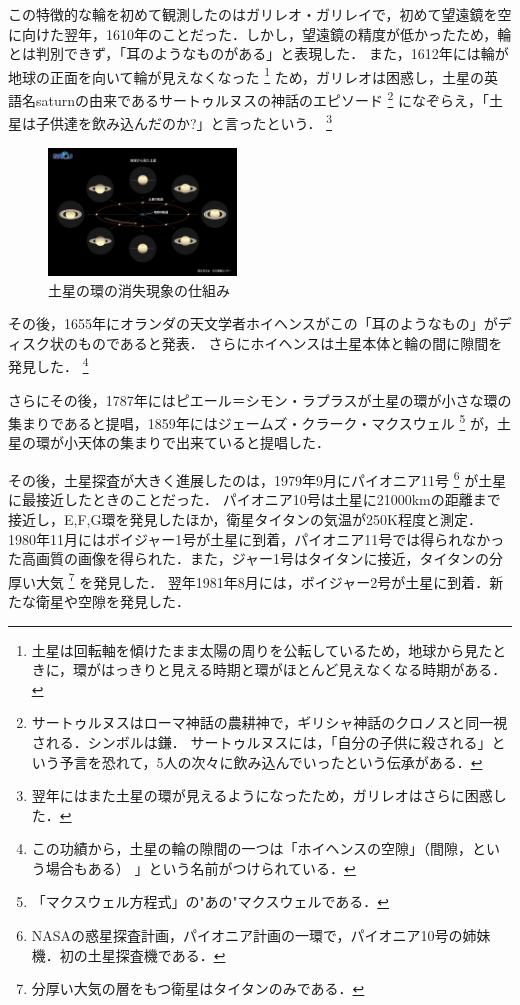 この特徴的な輪を初めて観測したのはガリレオ・ガリレイで，初めて望遠鏡を空に向けた翌年，1610年のことだった．しかし，望遠鏡の精度が低かったため，輪とは判別できず，「耳のようなものがある」と表現した．
また，1612年には輪が地球の正面を向いて輪が見えなくなった
\footnote{土星は回転軸を傾けたまま太陽の周りを公転しているため，地球から見たときに，環がはっきりと見える時期と環がほとんど見えなくなる時期がある．}
ため，ガリレオは困惑し，土星の英語名saturnの由来であるサートゥルヌスの神話のエピソード
\footnote{サートゥルヌスはローマ神話の農耕神で，ギリシャ神話のクロノスと同一視される．シンボルは鎌．
サートゥルヌスには，「自分の子供に殺される」という予言を恐れて，5人の次々に飲み込んでいったという伝承がある．}
になぞらえ，「土星は子供達を飲み込んだのか?」と言ったという．
\footnote{翌年にはまた土星の環が見えるようになったため，ガリレオはさらに困惑した．}

\begin{figure}[h]
\centering
\includegraphics[width=5cm]{img/saturn-ring-dissapear.jpg}
\caption{土星の環の消失現象の仕組み}
\end{figure}

その後，1655年にオランダの天文学者ホイヘンスがこの「耳のようなもの」がディスク状のものであると発表．
さらにホイヘンスは土星本体と輪の間に隙間を発見した．
\footnote{この功績から，土星の輪の隙間の一つは「ホイヘンスの空隙」（間隙，という場合もある）
」という名前がつけられている．}


さらにその後，1787年にはピエール＝シモン・ラプラスが土星の環が小さな環の集まりであると提唱，1859年にはジェームズ・クラーク・マクスウェル
\footnote{「マクスウェル方程式」の"あの"マクスウェルである．}
が，土星の環が小天体の集まりで出来ていると提唱した．


その後，土星探査が大きく進展したのは，1979年9月にパイオニア11号
\footnote{NASAの惑星探査計画，パイオニア計画の一環で，パイオニア10号の姉妹機．初の土星探査機である．}
が土星に最接近したときのことだった．
パイオニア10号は土星に21000kmの距離まで接近し，E,F,G環を発見したほか，衛星タイタンの気温が250K程度と測定．
1980年11月にはボイジャー1号が土星に到着，パイオニア11号では得られなかった高画質の画像を得られた．また，ジャー1号はタイタンに接近，タイタンの分厚い大気
\footnote{分厚い大気の層をもつ衛星はタイタンのみである．}
を発見した．
翌年1981年8月には，ボイジャー2号が土星に到着．新たな衛星や空隙を発見した．


